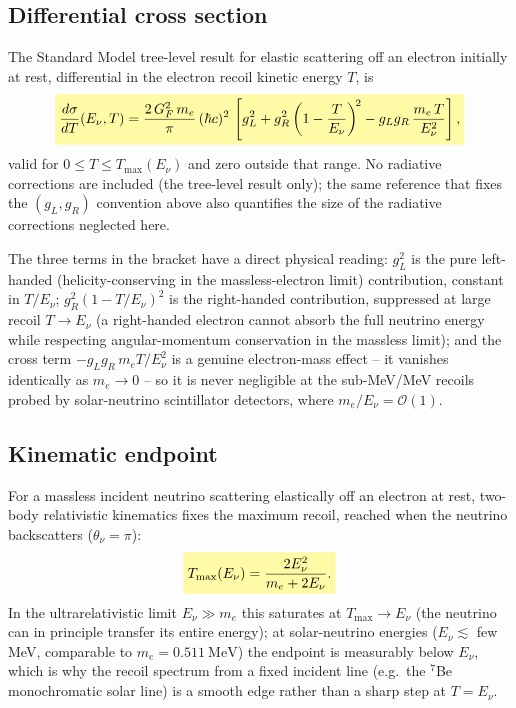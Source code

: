 \begin{theorybox}
\subsection*{Differential cross section}
The Standard Model tree-level result for elastic scattering off an electron
initially at rest, differential in the electron recoil kinetic energy $T$,
is \parencite{BahcallKamionkowskiSirlin1995,ParticleDataGroup}
\begin{equation}
  \keyresult{\frac{d\sigma}{dT}(E_\nu,T) =
    \frac{2\,G_F^2\,m_e}{\pi}\,(\hbar c)^2\,
    \left[g_L^2 + g_R^2\left(1-\frac{T}{E_\nu}\right)^{\!2}
      - g_L g_R\,\frac{m_e\,T}{E_\nu^2}\right],}
  \label{eq:nue-dsdt}
\end{equation}
valid for $0\leq T\leq T_{\max}(E_\nu)$ and zero outside that range. No
radiative corrections are included (the tree-level result only); the same
reference \parencite{BahcallKamionkowskiSirlin1995} that fixes the
$(g_L,g_R)$ convention above also quantifies the size of the radiative
corrections neglected here.

The three terms in the bracket have a direct physical reading: $g_L^2$ is
the pure left-handed (helicity-conserving in the massless-electron limit)
contribution, constant in $T/E_\nu$; $g_R^2(1-T/E_\nu)^2$ is the
right-handed contribution, suppressed at large recoil $T\to E_\nu$ (a
right-handed electron cannot absorb the full neutrino energy while
respecting angular-momentum conservation in the massless limit); and the
cross term $-g_Lg_R\,m_eT/E_\nu^2$ is a genuine electron-mass effect --
it vanishes identically as $m_e\to0$ -- so it is never negligible at the
sub-MeV/MeV recoils probed by solar-neutrino scintillator detectors, where
$m_e/E_\nu = \mathcal{O}(1)$.

\subsection*{Kinematic endpoint}
For a massless incident neutrino scattering elastically off an electron at
rest, two-body relativistic kinematics fixes the maximum recoil, reached
when the neutrino backscatters ($\theta_\nu=\pi$):
\begin{equation}
  \keyresult{T_{\max}(E_\nu) = \frac{2E_\nu^2}{m_e + 2E_\nu}.}
\end{equation}
In the ultrarelativistic limit $E_\nu\gg m_e$ this saturates at
$T_{\max}\to E_\nu$ (the neutrino can in principle transfer its entire
energy); at solar-neutrino energies ($E_\nu\lesssim$ few MeV, comparable to
$m_e=0.511\ \mathrm{MeV}$) the endpoint is measurably below $E_\nu$, which
is why the recoil spectrum from a fixed incident line (e.g.\ the $^7$Be
monochromatic solar line) is a smooth edge rather than a sharp step at
$T=E_\nu$.
\end{theorybox}

